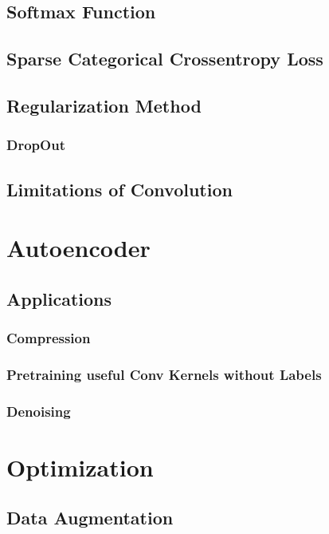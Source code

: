 \documentclass[a4paper, landscape, 10pt]{scrartcl}
\begin{document}
\begin{multicols*}{3}
        \subsection{Softmax Function}

        \subsection{Sparse Categorical Crossentropy Loss}

        \subsection{Regularization Method}
        \subsubsection{DropOut}
        
        \subsection{Limitations of Convolution}

        
        \section{Autoencoder}
        \subsection{Applications}
        \subsubsection{Compression}
        \subsubsection{Pretraining useful Conv Kernels without Labels}
        \subsubsection{Denoising}

        \section{Optimization}
        \subsection{Data Augmentation}

\end{multicols*}
\end{document}

